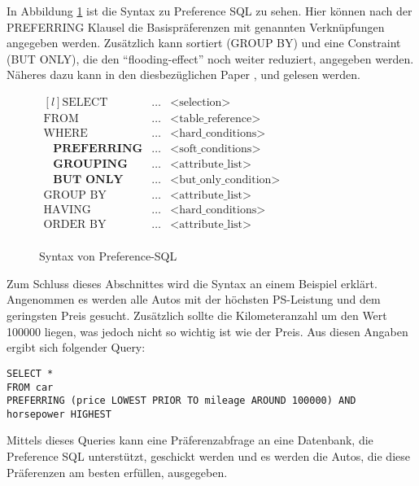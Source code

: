 {In Abbildung \ref{img:prefSQLSyntax} ist die Syntax zu Preference SQL zu sehen. Hier können nach der PREFERRING Klausel die Basispräferenzen mit genannten Verknüpfungen angegeben werden. Zusätzlich kann sortiert (GROUP BY) und eine Constraint (BUT ONLY), die den \enquote{flooding-effect} noch weiter reduziert, angegeben werden. Näheres dazu kann in den diesbezüglichen Paper \cite{kiessling2011preference}, \cite{kiessling2002foundations} und \cite{kiessling2002preference} gelesen werden.

\begin{figure}[H]
\centering
$\begin{matrix*}[l]
\text{SELECT} & \ldots & \text{<selection>} \\
\text{FROM} & \ldots & \text{<table\char`_reference>} \\
\text{WHERE} & \ldots & \text{<hard\char`_conditions>} \\
\hspace{10pt} \textbf{PREFERRING} & \ldots & \text{<soft\char`_conditions>} \\
\hspace{10pt} \textbf{GROUPING} & \ldots & \text{<attribute\char`_list>} \\
\hspace{10pt} \textbf{BUT ONLY} & \ldots & \text{<but\char`_only\char`_condition>} \\
\text{GROUP BY} & \ldots & \text{<attribute\char`_list>} \\
\text{HAVING} & \ldots & \text{<hard\char`_conditions>} \\
\text{ORDER BY} & \ldots & \text{<attribute\char`_list>} \\
\end{matrix*}$
	\caption{Syntax von Preference-SQL}
	\label{img:prefSQLSyntax}
\end{figure} 

Zum Schluss dieses Abschnittes wird die Syntax an einem Beispiel erklärt.
Angenommen es werden alle Autos mit der höchsten PS-Leistung und dem geringsten Preis gesucht. Zusätzlich sollte die Kilometeranzahl um den Wert 100000 liegen, was jedoch nicht so wichtig ist wie der Preis.
Aus diesen Angaben ergibt sich folgender Query:
\begin{verbatim}
SELECT * 
FROM car 
PREFERRING (price LOWEST PRIOR TO mileage AROUND 100000) AND
horsepower HIGHEST
\end{verbatim}


Mittels dieses Queries kann eine Präferenzabfrage an eine Datenbank, die Preference SQL unterstützt, geschickt werden und es werden die Autos, die diese Präferenzen am besten erfüllen, ausgegeben.
}
